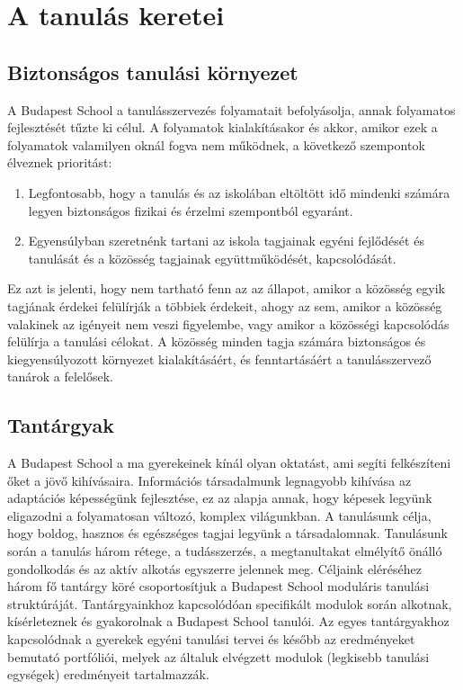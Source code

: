 \chapter{A tanulás keretei}


\section{Biztonságos tanulási környezet}

A Budapest School a tanulásszervezés folyamatait befolyásolja, annak folyamatos fejlesztését tűzte ki célul. A folyamatok kialakításakor és akkor, amikor ezek a folyamatok valamilyen oknál fogva nem működnek, a következő szempontok élveznek prioritást:

\begin{enumerate}

\item Legfontosabb, hogy a tanulás és az iskolában eltöltött idő mindenki számára legyen biztonságos fizikai és érzelmi szempontból egyaránt.

\item Egyensúlyban szeretnénk tartani az iskola  tagjainak egyéni fejlődését és tanulását és a közösség tagjainak együttműködését, kapcsolódását.

\end{enumerate}
Ez azt is jelenti, hogy nem tartható fenn az az állapot, amikor a közösség egyik tagjának érdekei felülírják a többiek érdekeit, ahogy az sem, amikor a közösség valakinek az igényeit nem veszi figyelembe, vagy amikor a közösségi kapcsolódás felülírja a tanulási célokat. A közösség minden tagja számára biztonságos és kiegyensúlyozott környezet kialakításáért, és fenntartásáért a tanulásszervező tanárok a felelősek.

\section{Tantárgyak}
\label{sec:tantargyak}
A Budapest School a ma gyerekeinek kínál olyan oktatást, ami segíti felkészíteni őket a jövő kihívásaira. Információs társadalmunk legnagyobb kihívása az adaptációs képességünk fejlesztése, ez az alapja annak, hogy képesek legyünk eligazodni a folyamatosan változó, komplex világunkban. A tanulásunk célja, hogy boldog, hasznos és egészséges tagjai legyünk a társadalomnak. Tanulásunk során a tanulás három rétege, a tudásszerzés, a megtanultakat elmélyítő önálló gondolkodás és az aktív alkotás egyszerre jelennek meg. Céljaink eléréséhez három fő tantárgy köré csoportosítjuk a Budapest School moduláris tanulási struktúráját. Tantárgyainkhoz kapcsolódóan specifikált modulok során alkotnak, kísérleteznek és gyakorolnak a Budapest School tanulói. Az egyes tantárgyakhoz kapcsolódnak a gyerekek egyéni tanulási tervei és később az eredményeket bemutató portfóliói, melyek az általuk elvégzett modulok (legkisebb tanulási egységek) eredményeit tartalmazzák.

